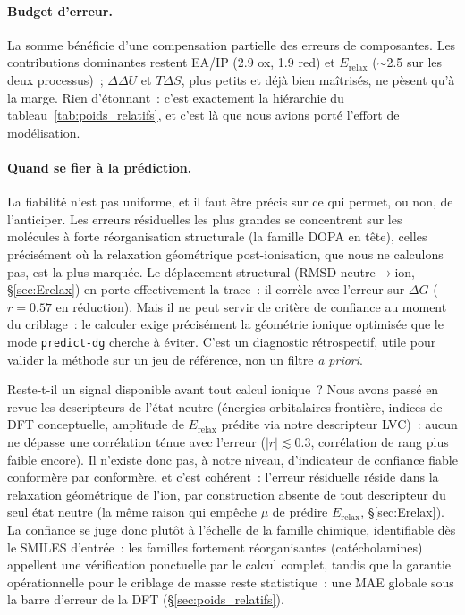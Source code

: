 \paragraph{Budget d'erreur.}
La somme bénéficie d'une compensation partielle des erreurs de composantes. Les contributions dominantes restent EA/IP (\SI{2.9}{} ox, \SI{1.9}{} red) et $E_{\text{relax}}$ ($\sim$\SI{2.5}{} sur les deux processus)~; $\Delta\Delta U$ et $T\Delta S$, plus petits et déjà bien maîtrisés, ne pèsent qu'à la marge. Rien d'étonnant~: c'est exactement la hiérarchie du tableau~\ref{tab:poids_relatifs}, et c'est là que nous avions porté l'effort de modélisation.

\paragraph{Quand se fier à la prédiction.}
La fiabilité n'est pas uniforme, et il faut être précis sur ce qui permet, ou non, de l'anticiper. Les erreurs résiduelles les plus grandes se concentrent sur les molécules à forte réorganisation structurale (la famille DOPA en tête), celles précisément où la relaxation géométrique post-ionisation, que nous ne calculons pas, est la plus marquée. Le déplacement structural (RMSD neutre$\rightarrow$ion, §\ref{sec:Erelax}) en porte effectivement la trace~: il corrèle avec l'erreur sur $\Delta G$ ($r = 0.57$ en réduction). Mais il ne peut servir de critère de confiance au moment du criblage~: le calculer exige précisément la géométrie ionique optimisée que le mode \texttt{predict-dg} cherche à éviter. C'est un diagnostic rétrospectif, utile pour valider la méthode sur un jeu de référence, non un filtre \emph{a priori}.

Reste-t-il un signal disponible avant tout calcul ionique~? Nous avons passé en revue les descripteurs de l'état neutre (énergies orbitalaires frontière, indices de DFT conceptuelle, amplitude de $E_{\text{relax}}$ prédite via notre descripteur LVC)~: aucun ne dépasse une corrélation ténue avec l'erreur ($|r| \lesssim 0.3$, corrélation de rang plus faible encore). Il n'existe donc pas, à notre niveau, d'indicateur de confiance fiable conformère par conformère, et c'est cohérent~: l'erreur résiduelle réside dans la relaxation géométrique de l'ion, par construction absente de tout descripteur du seul état neutre (la même raison qui empêche $\mu$ de prédire $E_{\text{relax}}$, §\ref{sec:Erelax}). La confiance se juge donc plutôt à l'échelle de la famille chimique, identifiable dès le SMILES d'entrée~: les familles fortement réorganisantes (catécholamines) appellent une vérification ponctuelle par le calcul complet, tandis que la garantie opérationnelle pour le criblage de masse reste statistique~: une MAE globale sous la barre d'erreur de la DFT (§\ref{sec:poids_relatifs}).


